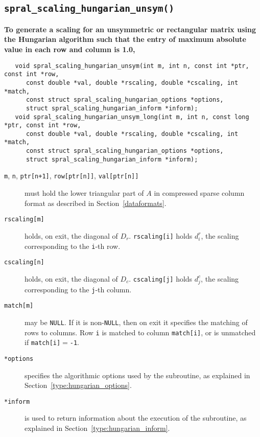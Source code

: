 \subsection{\texttt{spral\_scaling\_hungarian\_unsym()}}

\textbf{\noindent
   To generate a scaling for an unsymmetric or rectangular matrix using the Hungarian algorithm such that the entry of maximum absolute value in each row and column is 1.0,
}
\vspace*{-0.1cm}
\begin{verbatim}
   void spral_scaling_hungarian_unsym(int m, int n, const int *ptr, const int *row,
      const double *val, double *rscaling, double *cscaling, int *match,
      const struct spral_scaling_hungarian_options *options,
      struct spral_scaling_hungarian_inform *inform);
   void spral_scaling_hungarian_unsym_long(int m, int n, const long *ptr, const int *row,
      const double *val, double *rscaling, double *cscaling, int *match,
      const struct spral_scaling_hungarian_options *options,
      struct spral_scaling_hungarian_inform *inform);
\end{verbatim}

\begin{description}

\item[\texttt{m}, \texttt{n}, \texttt{ptr[n+1]}, \texttt{row[ptr[n]]}, \texttt{val[ptr[n]]}] must hold the lower triangular part of $A$ in compressed sparse column format as described in Section~\ref{dataformats}.

\item[\texttt{rscaling[m]}] holds, on exit, the diagonal of $D_r$.
\texttt{rscaling[i]} holds $d^r_i$, the scaling corresponding to the
\texttt{i}-th row.

\item[\texttt{cscaling[n]}] holds, on exit, the diagonal of $D_c$.
\texttt{cscaling[j]} holds $d^c_j$, the scaling corresponding to the
\texttt{j}-th column.

\item[\texttt{match[m]}] may be \texttt{NULL}. If it is non-\texttt{NULL},
then on exit it specifies the matching of rows to columns.
Row \texttt{i} is matched to column \texttt{match[i]}, or is unmatched
if \texttt{match[i]}$=$\texttt{-1}.

\item[\texttt{*options}] specifies the algorithmic options used by the subroutine, as explained in Section~\ref{type:hungarian_options}.

\item[\texttt{*inform}] is used to return information about the execution of the subroutine, as explained in Section~\ref{type:hungarian_inform}.


\end{description}

